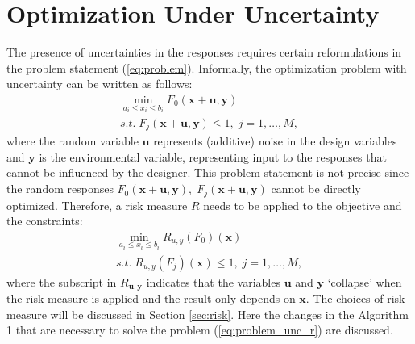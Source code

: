 \documentclass[10pt,twocolumn,a4paper]{article}
\begin{document}
\section{Optimization Under Uncertainty}

The presence of uncertainties in the responses requires certain reformulations in the problem statement (\ref{eq:problem}). Informally, the optimization problem with uncertainty can be written as follows:
\begin{equation}
  \label{eq:problem_unc}
  \begin{array}{c}
  \min_{a_i \le x_i \le b_i}F_0(\pmb x + \pmb u, \pmb y) \\
  s.t.\; F_j(\pmb x + \pmb u, \pmb y) \le 1,\; j=1,\dots ,M,
  \end{array}
\end{equation}
where the random variable $\pmb u$ represents (additive) noise in the design variables and $\pmb y$ is the environmental variable, representing input to the responses that cannot be influenced by the designer. This problem statement is not precise since the random responses $F_0 (\pmb x+\pmb u,\pmb y),\; F_j (\pmb x+\pmb u,\pmb y)$ cannot be directly optimized. Therefore, a risk measure $R$ needs to be applied to the objective and the constraints:
\begin{equation}
  \label{eq:problem_unc_r}
  \begin{array}{c}
  \min_{a_i \le x_i \le b_i}R_{u,y}(F_0)(\pmb x) \\
  s.t.\; R_{u,y}(F_j)(\pmb x) \le 1,\; j=1,\dots ,M,
  \end{array}
\end{equation}
where the subscript in $R_{\pmb u,\pmb y}$ indicates that the variables $\pmb u$ and $\pmb y$ ‘collapse’ when the risk measure is applied and the result only depends on $\pmb x$. The choices of risk measure will be discussed in Section \ref{sec:risk}. Here the changes in the Algorithm 1 that are necessary to solve the problem (\ref{eq:problem_unc_r}) are discussed.
\end{document}

